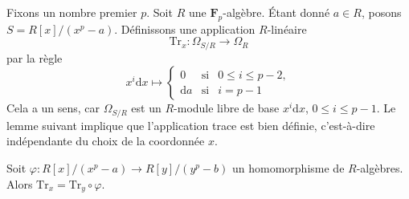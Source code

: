 \medskip\noindent Fixons un nombre premier $p$. Soit $R$ une $\mathbf{F}_p$-algèbre. Étant donné $a \in R$, posons $S = R[x]/(x^p - a)$. Définissons une application $R$-linéaire $$
\text{Tr}_x : \Omega_{S/R} \longrightarrow \Omega_R
$$ par la règle $$
x^i\text{d}x \longmapsto
\left\{
\begin{matrix}
0 & \text{si} & 0 \leq i \leq p - 2, \\
\text{d}a & \text{si} & i = p - 1
\end{matrix}
\right.
$$ Cela a un sens, car $\Omega_{S/R}$ est un $R$-module libre de base $x^i\text{d}x$, $0 \leq i \leq p - 1$. Le lemme suivant implique que l'application trace est bien définie, c'est-à-dire indépendante du choix de la coordonnée $x$.

\begin{lemma} \label{lemma-trace-well-defined} Soit $\varphi : R[x]/(x^p - a) \to R[y]/(y^p - b)$ un homomorphisme de $R$-algèbres. Alors $\text{Tr}_x = \text{Tr}_y \circ \varphi$. \end{lemma}

